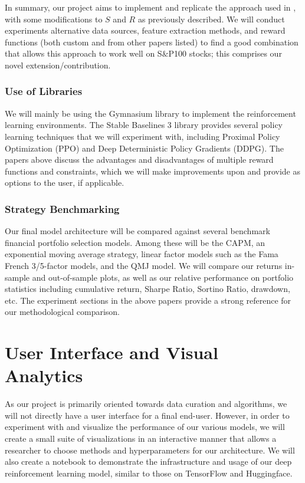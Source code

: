 In summary, our project aims to implement and replicate the approach used in \cite{rl_augmented_states}, with 
some modifications to $S$ and $R$ as previously described. We will conduct experiments alternative data 
sources, feature extraction methods, and reward functions (both custom and from other papers listed) 
to find a good combination that allows this approach to work well on S$\&$P100 stocks; this comprises our 
novel extension/contribution.

\subsubsection{Use of Libraries}

We will mainly be using the Gymnasium library to implement the reinforcement learning environments. 
The Stable Baselines 3 library provides several policy learning techniques that we will experiment with, 
including Proximal Policy Optimization (PPO) and Deep Deterministic Policy Gradients (DDPG). 
The papers above discuss the advantages and disadvantages of multiple reward functions and constraints, 
which we will make improvements upon and provide as options to the user, if applicable.

\subsubsection{Strategy Benchmarking}

Our final model architecture will be compared against several benchmark financial portfolio selection 
models. Among these will be the CAPM, an exponential moving average strategy, linear factor models 
such as the Fama French 3/5-factor models, and the QMJ model. We will compare our returns 
in-sample and out-of-sample plots, as well as our relative performance on portfolio statistics 
including cumulative return, Sharpe Ratio, Sortino Ratio, drawdown, etc. The experiment sections 
in the above papers provide a strong reference for our methodological comparison.

\section{User Interface and Visual Analytics}

As our project is primarily oriented towards data curation and algorithms, we will not directly have a 
user interface for a final end-user. However, in order to experiment with and visualize the performance 
of our various models, we will create a small suite of visualizations in an interactive manner that 
allows a researcher to choose methods and hyperparameters for our architecture. We will also create a 
notebook to demonstrate the infrastructure and usage of our deep reinforcement learning model, 
similar to those on TensorFlow and Huggingface.
